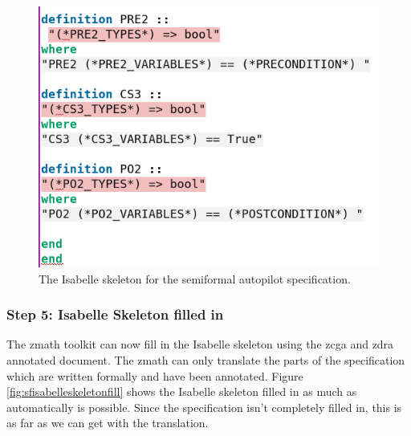 \begin{figure}[H]
\begin{minipage}{0.45\textwidth}
     \includegraphics[width=\linewidth]{Figures/fullexample/sfisabelle2.png}
     \end{minipage}
     \caption{The Isabelle skeleton for the semiformal autopilot specification. \label{fig:sfisabelleskeleton}}
\end{figure}

\subsubsection{Step 5: Isabelle Skeleton filled in}

The \gls{zmath} toolkit can now fill in the Isabelle skeleton using the
\gls{zcga} and \gls{zdra} annotated document. The \gls{zmath} can only translate
the parts of the specification which are written formally and have been
annotated. Figure \ref{fig:sfisabelleskeletonfill} shows the Isabelle skeleton filled in as much as
automatically is possible. Since the specification isn't completely filled in, this is as far as we can get
with the translation.

